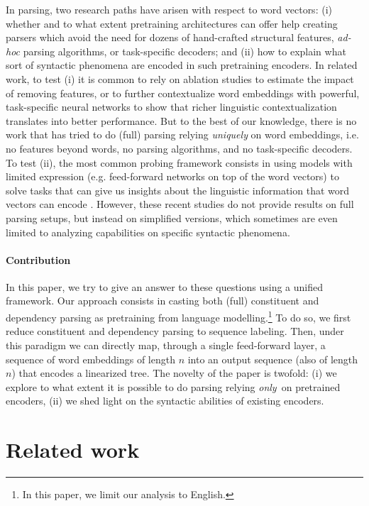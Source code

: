 \documentclass[letterpaper]{article} %
\begin{document}
In parsing, two research paths have arisen with respect to word vectors:
(i) whether and to what extent pretraining architectures can offer help creating parsers which avoid the need for dozens of hand-crafted structural features, \emph{ad-hoc} parsing algorithms, or task-specific decoders; and (ii) how to explain what sort of syntactic phenomena are encoded in such pretraining encoders.
In related work, to test (i) it is common to rely on ablation studies to estimate the impact of  removing features, or to further contextualize word embeddings with powerful, task-specific neural networks to show that richer linguistic contextualization translates into better performance. But to the best of our knowledge, there is no work that has tried to do (full) parsing relying \emph{uniquely} on word embeddings, i.e. no features beyond words, no parsing algorithms, and no  task-specific decoders. To test (ii), the most common probing framework consists in using models with limited expression (e.g. feed-forward networks on top of the word vectors) to solve tasks that can give us insights about the linguistic information that word vectors can encode \cite{tenney2018you}. However, these recent studies do not provide results on full parsing setups, but instead on simplified versions, which sometimes are even limited to analyzing capabilities on specific syntactic phenomena.

\paragraph{Contribution}  
In this paper, we try to give an answer to these questions using a unified framework. Our approach consists in casting both (full) constituent and dependency parsing as pretraining from language modelling.\footnote{In this paper, we limit our analysis to English.} To do so, we first reduce constituent and dependency parsing to sequence labeling. Then, under this paradigm we can directly map, through a single feed-forward layer, a sequence of word embeddings of length $n$ into an output sequence (also of length $n$) that encodes a linearized tree. The novelty of the paper is twofold: (i) we explore to what extent it is possible to do parsing relying {\em only}~on pretrained encoders, (ii) we shed light on the syntactic abilities of existing encoders.


\section{Related work}\label{section-related-work}
\end{document}
